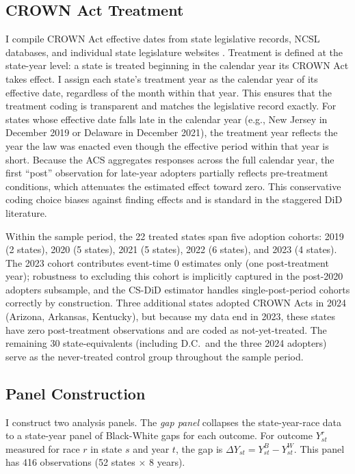 \documentclass[12pt]{article}
\begin{document}
\subsection{CROWN Act Treatment}

I compile CROWN Act effective dates from state legislative records, NCSL databases, and individual state legislature websites \citep{ncsl2024crown}. Treatment is defined at the state-year level: a state is treated beginning in the calendar year its CROWN Act takes effect. I assign each state's treatment year as the calendar year of its effective date, regardless of the month within that year. This ensures that the treatment coding is transparent and matches the legislative record exactly. For states whose effective date falls late in the calendar year (e.g., New Jersey in December 2019 or Delaware in December 2021), the treatment year reflects the year the law was enacted even though the effective period within that year is short. Because the ACS aggregates responses across the full calendar year, the first ``post'' observation for late-year adopters partially reflects pre-treatment conditions, which attenuates the estimated effect toward zero. This conservative coding choice biases against finding effects and is standard in the staggered DiD literature.

Within the sample period, the 22 treated states span five adoption cohorts: 2019 (2 states), 2020 (5 states), 2021 (5 states), 2022 (6 states), and 2023 (4 states). The 2023 cohort contributes event-time 0 estimates only (one post-treatment year); robustness to excluding this cohort is implicitly captured in the post-2020 adopters subsample, and the CS-DiD estimator handles single-post-period cohorts correctly by construction. Three additional states adopted CROWN Acts in 2024 (Arizona, Arkansas, Kentucky), but because my data end in 2023, these states have zero post-treatment observations and are coded as not-yet-treated. The remaining 30 state-equivalents (including D.C.\ and the three 2024 adopters) serve as the never-treated control group throughout the sample period.

\subsection{Panel Construction}

I construct two analysis panels. The \textit{gap panel} collapses the state-year-race data to a state-year panel of Black-White gaps for each outcome. For outcome $Y_{st}^r$ measured for race $r$ in state $s$ and year $t$, the gap is $\Delta Y_{st} = Y_{st}^{B} - Y_{st}^{W}$. This panel has 416 observations (52 states $\times$ 8 years).
\end{document}
